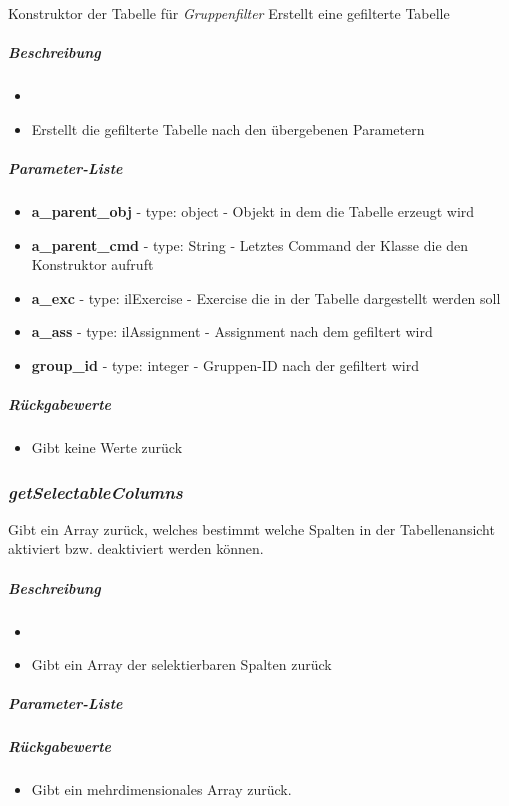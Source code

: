 Konstruktor der Tabelle für \textit{Gruppenfilter}
Erstellt eine gefilterte Tabelle
\subparagraph{Beschreibung}
\begin{itemize}
	\item[]  \noindent{}
	\item[] Erstellt die gefilterte Tabelle nach den übergebenen Parametern
\end{itemize}
\subparagraph{Parameter-Liste}
\begin{itemize}
	\item[] \textbf{a\_parent\_obj} - type: object - Objekt in dem die Tabelle erzeugt wird
	\item[] \textbf{a\_parent\_cmd} - type: String - Letztes Command der Klasse die den Konstruktor aufruft
	\item[]\textbf{a\_exc} - type: ilExercise - Exercise die in der Tabelle dargestellt werden soll
	\item[]\textbf{a\_ass} - type: ilAssignment - Assignment nach dem gefiltert wird
	\item[]\textbf{group\_id} - type: integer - Gruppen-ID nach der gefiltert wird
\end{itemize}
\subparagraph{Rückgabewerte}
\begin{itemize}
	\item[] Gibt keine Werte zurück
\end{itemize}



\subsubsection*{\textit{getSelectableColumns}}\label{getSelectableColumns}


Gibt ein Array zurück, welches bestimmt welche Spalten in der Tabellenansicht aktiviert bzw. deaktiviert werden können.
\subparagraph{Beschreibung}
\begin{itemize}
	\item[]  \noindent{}
	\item[] Gibt ein Array der selektierbaren Spalten zurück
\end{itemize}
\subparagraph{Parameter-Liste}
\subparagraph{Rückgabewerte}
\begin{itemize}
	\item[] Gibt ein mehrdimensionales Array zurück.
\end{itemize}

